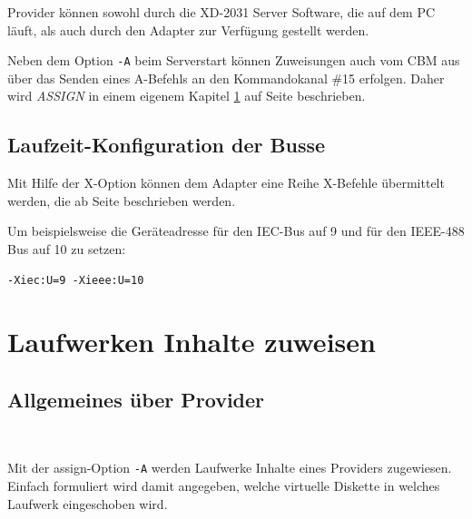 \documentclass[10pt,a4paper]{scrartcl}		%
\begin{document}
Provider können sowohl durch die XD-2031 Server Software,
die auf dem PC läuft, als auch durch den Adapter zur Verfügung
gestellt werden.

Neben dem Option \texttt{-A} beim
Serverstart können Zuweisungen auch vom CBM aus über das
Senden eines A-Befehls an den Kommandokanal \#15 erfolgen.  
Daher wird \textit{ASSIGN} in einem eigenem
Kapitel \ref{assign} \glqq{}\grqq{} 
auf Seite \pageref{assign} beschrieben.

\subsection{Laufzeit-Konfiguration der Busse}
\mbox{ \Big[ \ldots \Big] }

Mit Hilfe der X-Option können dem Adapter eine Reihe
X-Befehle übermittelt werden, die ab Seite \pageref{xcommands}
beschrieben werden.

Um beispielsweise die Geräteadresse für den IEC-Bus auf
9 und für den \mbox{IEEE-488} Bus auf 10 zu setzen:

\begin{verbatim}
-Xiec:U=9 -Xieee:U=10
\end{verbatim}

\clearpage
\section{Laufwerken Inhalte zuweisen}
\label{assign}

\subsection{Allgemeines über Provider}

\mbox{ \Big[ \texttt{A}\textit{<Laufwerk-Nummer>} 
\texttt{:} \textit{<Provider>} \texttt{=}
\textit{<Parameter>} \Big] \Big[ \ldots \Big] }

Mit der \glqq{}assign\grqq{}-Option \texttt{-A} werden Laufwerke Inhalte
eines Providers zugewiesen. Einfach formuliert wird damit angegeben,
welche \glqq{}virtuelle Diskette\grqq{} in welches Laufwerk
eingeschoben wird.
\end{document}
